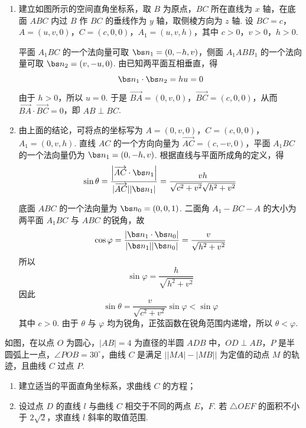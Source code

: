 \begin{solution}
\begin{enumerate}
\item 建立如图所示的空间直角坐标系，取 \(B\) 为原点，\(BC\) 所在直线为 \(x\) 轴，在底面 \(ABC\) 内过 \(B\) 作 \(BC\) 的垂线作为 \(y\) 轴，取侧棱方向为 \(z\) 轴. 设 \(BC=c\)，\(A=(u,v,0)\)，\(C=(c,0,0)\)，\(A_{1}=(u,v,h)\)，其中 \(c>0\)，\(v>0\)，\(h>0\).

平面 \(A_{1}BC\) 的一个法向量可取 \(\bs n_{1}=(0,-h,v)\)，侧面 \(A_{1}ABB_{1}\) 的一个法向量可取 \(\bs n_{2}=(v,-u,0)\). 由已知两平面互相垂直，得
\[
\bs n_{1}\cdot\bs n_{2}=hu=0
\]
由于 \(h>0\)，所以 \(u=0\). 于是 \(\overrightarrow{BA}=(0,v,0)\)，\(\overrightarrow{BC}=(c,0,0)\)，从而 \(\overrightarrow{BA}\cdot\overrightarrow{BC}=0\)，即 \(AB\perp BC\).

\item 由上面的结论，可将点的坐标写为 \(A=(0,v,0)\)，\(C=(c,0,0)\)，\(A_{1}=(0,v,h)\). 直线 \(AC\) 的一个方向向量为 \(\overrightarrow{AC}=(c,-v,0)\)，平面 \(A_{1}BC\) 的一个法向量仍为 \(\bs n_{1}=(0,-h,v)\). 根据直线与平面所成角的定义，得
\[
\sin\theta=\frac{\left\lvert\overrightarrow{AC}\cdot\bs n_{1}\right\rvert}{\lvert\overrightarrow{AC}\rvert\lvert\bs n_{1}\rvert}=\frac{vh}{\sqrt{c^{2}+v^{2}}\sqrt{h^{2}+v^{2}}}
\]

底面 \(ABC\) 的一个法向量为 \(\bs n_{0}=(0,0,1)\). 二面角 \(A_{1}-BC-A\) 的大小为两平面 \(A_{1}BC\) 与 \(ABC\) 的锐角，故
\[
\cos\varphi=\frac{\lvert\bs n_{1}\cdot\bs n_{0}\rvert}{\lvert\bs n_{1}\rvert\lvert\bs n_{0}\rvert}=\frac{v}{\sqrt{h^{2}+v^{2}}}
\]
所以
\[
\sin\varphi=\frac{h}{\sqrt{h^{2}+v^{2}}}
\]
因此
\[
\sin\theta=\frac{v}{\sqrt{c^{2}+v^{2}}}\sin\varphi<\sin\varphi
\]
其中 \(c>0\). 由于 \(\theta\) 与 \(\varphi\) 均为锐角，正弦函数在锐角范围内递增，所以 \(\theta<\varphi\).
\end{enumerate}
\end{solution}

\begin{problem}
如图，在以点 \(O\) 为圆心，\(|AB| = 4\) 为直径的半圆 \(ADB\) 中，\(OD \perp AB\)，\(P\) 是半圆弧上一点，\(\angle POB = 30^{\circ}\)，曲线 \(C\) 是满足 \(\left||MA|-|MB|\right|\) 为定值的动点 \(M\) 的轨迹，且曲线 \(C\) 过点 \(P\).
\begin{enumerate}
\item 建立适当的平面直角坐标系，求曲线 \(C\) 的方程；
\item 设过点 \(D\) 的直线 \(l\) 与曲线 \(C\) 相交于不同的两点 \(E\)，\(F\). 若 \(\triangle OEF\) 的面积不小于 \(2\sqrt{2}\)，求直线 \(l\) 斜率的取值范围.
\end{enumerate}


\end{problem}

